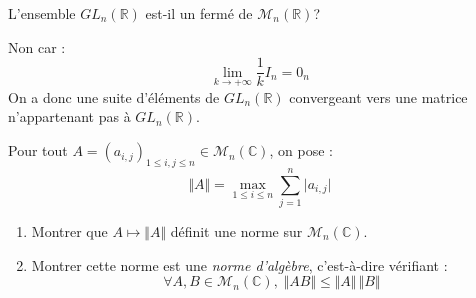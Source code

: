 \documentclass[a4paper,10pt]{report}
\begin{document}
\begin{Exa} L'ensemble $GL_n(\mathbb{R})$ est-il un fermé de $\mathcal{M}_n(\mathbb{R})$?
\end{Exa} 

\corr Non car :
$$ \lim_{k \rightarrow + \infty} \dfrac{1}{k} I_n = 0_n$$
On a donc une suite d'éléments de $GL_n(\mathbb{R})$ convergeant vers une matrice n'appartenant pas à $GL_n(\mathbb{R})$.

\begin{Exa} Pour tout $A = (a_{i,j})_{1 \leq i,j \leq n} \in \mathcal{M}_{n}(\mathbb{C})$, on pose :
  \[
  \Vert A \Vert = \max_{1 \leq i \leq n} \sum_{j = 1}^{n}  \vert a_{i,j} \vert
  \]
  \begin{enumerate}
  \item Montrer que $A \mapsto \Vert A \Vert$ définit une norme sur $\mathcal{M}_{n}(\mathbb{C})$.
  \item Montrer cette norme est une \textit{norme d'algèbre}, c'est-à-dire vérifiant :
    \[
    \forall A,B \in \mathcal{M}_{n}(\mathbb{C}),  \; \Vert AB \Vert \leq \Vert A \Vert \, \Vert B \Vert
    \]
  \end{enumerate}
\end{Exa}

\corr 
\end{document}
